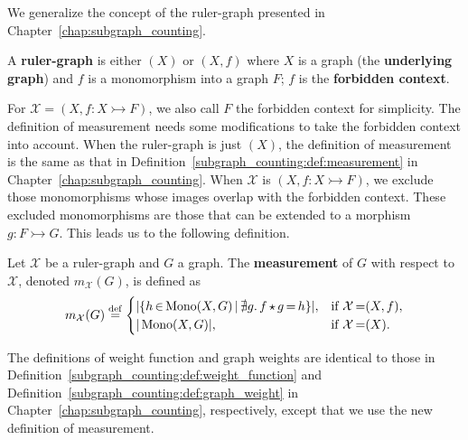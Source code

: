 We generalize the concept of the ruler-graph presented in Chapter~\ref{chap:subgraph_counting}.

\begin{definition}
    \label{antipattern:def:ruler_graph}
    A \textbf{ruler-graph} is either $(X)$ or \( (X, f) \) where $X$ is a graph (the \textbf{underlying graph}) and $f$ is a monomorphism into a graph $F$; $f$ is the \textbf{forbidden context}.
\end{definition}
For $\mathcal{X} \mathop{=} (X, f:X \rightarrowtail F)$, we also call $F$ the forbidden context for simplicity.
The definition of measurement needs some modifications to take the forbidden context into account. When the ruler-graph is just $(X)$, the definition of measurement is the same as that in Definition~\ref{subgraph_counting:def:measurement} in Chapter~\ref{chap:subgraph_counting}. When $\mathcal{X}$ is $(X, f:X \rightarrowtail F)$, we exclude those monomorphisms whose images overlap with the forbidden context. These excluded monomorphisms are those that can be extended to a morphism $g: F \rightarrowtail G$. This leads us to the following definition.
\begin{definition} 
    \label{antipattern:def:measurement}
    Let \( \mathcal{X}\) be a ruler-graph and \( G \) a graph. The \textbf{measurement} of \( G \) with respect to \( \mathcal{X}\), denoted \( m_\mathcal{X}(G) \), is defined as 
    \[
        m_\mathcal{X}(G) \overset{\operatorname{def}}{=}
        \begin{cases}
            |\{h \mathop{\in} \operatorname{Mono}(X,G) \mathop{\mid} \nexists g.\,f \mathop{\star} g \mathop{=} h \}|, & \text{if } \mathcal{X} \mathop{=} (X, f), \\
            |\operatorname{Mono}(X,G)|, & \text{if } \mathcal{X} \mathop{=} (X).
        \end{cases}
    \]
\end{definition}
The definitions of weight function and graph weights are identical to those in Definition~\ref{subgraph_counting:def:weight_function} and Definition~\ref{subgraph_counting:def:graph_weight} in Chapter~\ref{chap:subgraph_counting}, respectively, except that we use the new definition of measurement.